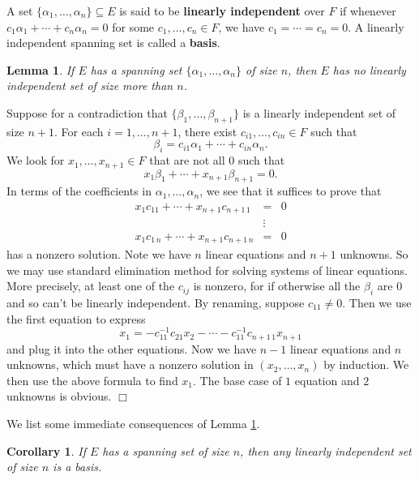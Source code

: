\documentclass{article}
\newtheorem{cor}[subsection]{Corollary}
\newtheorem{lemma}[subsection]{Lemma}
\newenvironment{proof}{\noindent {\bf Proof:}}{$\Box$ \vspace{2 ex}}
\begin{document}
A set $\{\alpha_1,\ldots,\alpha_n\}\subseteq E$ is said to be \textbf{linearly independent} over $F$ if whenever $c_1\alpha_1 + \cdots + c_n\alpha_n = 0$ for some $c_1,\ldots,c_n\in F$, we have $c_1 = \cdots = c_n = 0.$ A linearly independent spanning set is called a \textbf{basis}.

\begin{lemma}\label{lem:span}
    If $E$ has a spanning set $\{\alpha_1,\ldots,\alpha_n\}$ of size $n$, then $E$ has no linearly independent set of size more than $n$.
\end{lemma}

\begin{proof}
    Suppose for a contradiction that $\{\beta_1,\ldots,\beta_{n+1}\}$ is a linearly independent set of size $n+1$. For each $i = 1,\ldots,n+1$, there exist $c_{i1},\ldots,c_{in}\in F$ such that $$\beta_i = c_{i1}\alpha_1 + \cdots + c_{in}\alpha_n.$$
    We look for $x_1,\ldots,x_{n+1}\in F$ that are not all $0$ such that $$x_1\beta_1 + \cdots + x_{n+1}\beta_{n+1} = 0.$$
    In terms of the coefficients in $\alpha_1,\ldots,\alpha_n$, we see that it suffices to prove that 
    \begin{eqnarray*}
        x_1c_{11} + \cdots + x_{n+1}c_{n+1\,1}&=&0\\
        &\vdots&\\
        x_1c_{1\,n} + \cdots + x_{n+1}c_{n+1\,n}&=&0
    \end{eqnarray*}
    has a nonzero solution. Note we have $n$ linear equations and $n+1$ unknowns. So we may use standard elimination method for solving systems of linear equations. More precisely, at least one of the $c_{ij}$ is nonzero, for if otherwise all the $\beta_i$ are $0$ and so can't be linearly independent. By renaming, suppose $c_{11}\neq 0$. Then we use the first equation to express $$x_1 = -c_{11}^{-1}c_{21}x_2 - \cdots -c_{11}^{-1}c_{n+1\,1}x_{n+1}$$ and plug it into the other equations. Now we have $n-1$ linear equations and $n$ unknowns, which must have a nonzero solution in $(x_2,\ldots,x_n)$ by induction. We then use the above formula to find $x_1$. The base case of $1$ equation and $2$ unknowns is obvious.
\end{proof}

We list some immediate consequences of Lemma \ref{lem:span}.
\begin{cor}
    If $E$ has a spanning set of size $n$, then any linearly independent set of size $n$ is a basis.
\end{cor}
\end{document}
